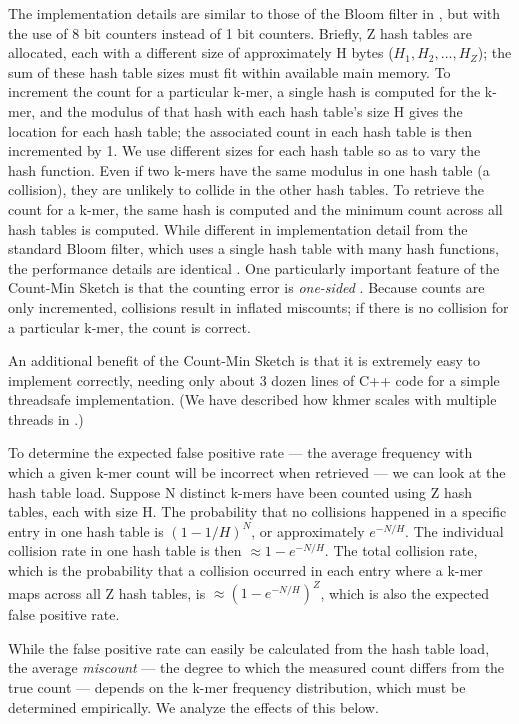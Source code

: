 The implementation details are similar to those of the Bloom filter in
\cite{Pell2012}, but with the use of 8 bit counters instead of 1 bit
counters.  Briefly, Z hash tables are allocated, each with a different
size of approximately H bytes ($H_1, H_2, ..., H_Z$); the sum of these
hash table sizes must fit within available main memory.  To increment
the count for a particular k-mer, a single hash is computed for the
k-mer, and the modulus of that hash with each hash table's size H
gives the location for each hash table; the associated count in each
hash table is then incremented by 1.  We use different sizes for each
hash table so as to vary the hash function.  Even if two k-mers have
the same modulus in one hash table (a collision), they are unlikely to
collide in the other hash tables.  To retrieve the count for a k-mer,
the same hash is computed and the minimum count across all hash tables
is computed. While different in implementation detail from the
standard Bloom filter, which uses a single hash table with many
hash functions, the performance details are identical \cite{Pell2012}.
% 
One particularly important feature of the Count-Min Sketch is that the
counting error is {\em one-sided} \cite{Cormode2005}.  Because counts
are only incremented, collisions result in inflated miscounts; if
there is no collision for a particular k-mer, the count is correct.

An additional benefit of the Count-Min Sketch is that it is extremely
easy to implement correctly, needing only about 3 dozen lines of C++
code for a simple threadsafe implementation.  (We have
described how khmer scales with multiple threads in
\cite{McDonald2013}.)

To determine the expected false positive rate --- the average frequency with
which a given k-mer count will be incorrect when retrieved --- we can
look at the hash table load. Suppose N distinct k-mers have been counted
using Z hash tables, each with size H.  The probability that no
collisions happened in a specific entry in one hash table is
$(1-1/H)^{N}$, or approximately $e^{-N/H}$. The individual collision
rate in one hash table is then $\approx 1-e^{-N/H}$. The total
collision rate, which is the probability that a collision occurred in
each entry where a k-mer maps across all Z hash tables, is $\approx
(1-e^{-N/H})^{Z}$, which is also the expected false positive rate.

While the false positive rate can easily be calculated from the hash table
load, the average {\em miscount} --- the degree to which the measured
count differs from the true count --- depends on the k-mer frequency
distribution, which must be determined empirically.  We analyze the
effects of this below.



